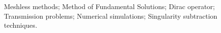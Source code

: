 \acresetall
\noindent
Meshless methods; Method of Fundamental Solutions; Dirac operator; Transmission problems; Numerical simulations; Singularity subtraction techniques.